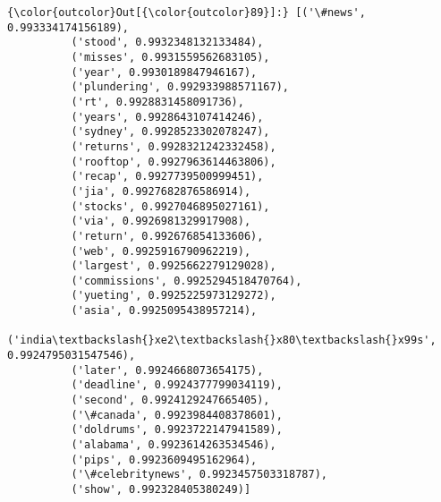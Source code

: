 \documentclass[11pt]{article}
\begin{document}
\begin{Verbatim}[commandchars=\\\{\}]
{\color{outcolor}Out[{\color{outcolor}89}]:} [('\#news', 0.993334174156189),
          ('stood', 0.9932348132133484),
          ('misses', 0.9931559562683105),
          ('year', 0.9930189847946167),
          ('plundering', 0.992933988571167),
          ('rt', 0.9928831458091736),
          ('years', 0.9928643107414246),
          ('sydney', 0.9928523302078247),
          ('returns', 0.9928321242332458),
          ('rooftop', 0.9927963614463806),
          ('recap', 0.9927739500999451),
          ('jia', 0.9927682876586914),
          ('stocks', 0.9927046895027161),
          ('via', 0.9926981329917908),
          ('return', 0.992676854133606),
          ('web', 0.9925916790962219),
          ('largest', 0.9925662279129028),
          ('commissions', 0.9925294518470764),
          ('yueting', 0.9925225973129272),
          ('asia', 0.9925095438957214),
          ('india\textbackslash{}xe2\textbackslash{}x80\textbackslash{}x99s', 0.9924795031547546),
          ('later', 0.9924668073654175),
          ('deadline', 0.9924377799034119),
          ('second', 0.9924129247665405),
          ('\#canada', 0.9923984408378601),
          ('doldrums', 0.9923722147941589),
          ('alabama', 0.9923614263534546),
          ('pips', 0.9923609495162964),
          ('\#celebritynews', 0.9923457503318787),
          ('show', 0.992328405380249)]
\end{Verbatim}
            

    
    
    
    
\end{document}
